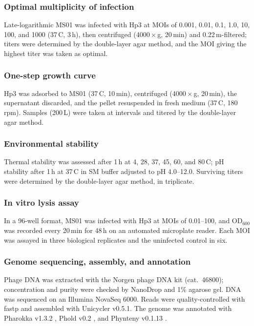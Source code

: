 \subsubsection*{Optimal multiplicity of infection}
Late-logarithmic MS01 was infected with Hp3 at MOIs of 0.001, 0.01, 0.1, 1.0, 10,
100, and 1000 (37\,\textdegree C, 3\,h), then centrifuged (4000\,$\times$\,g,
20\,min) and 0.22\,\textmu m-filtered; titers were determined by the double-layer
agar method, and the MOI giving the highest titer was taken as optimal.

\subsubsection*{One-step growth curve}
Hp3 was adsorbed to MS01 (37\,\textdegree C, 10\,min), centrifuged
(4000\,$\times$\,g, 20\,min), the supernatant discarded, and the pellet resuspended
in fresh medium (37\,\textdegree C, 180\,rpm). Samples (200\,\textmu L) were taken
at intervals and titered by the double-layer agar method.

\subsubsection*{Environmental stability}
Thermal stability was assessed after 1\,h at 4, 28, 37, 45, 60, and
80\,\textdegree C; pH stability after 1\,h at 37\,\textdegree C in SM buffer
adjusted to pH 4.0--12.0. Surviving titers were determined by the double-layer agar
method, in triplicate.

\subsubsection*{In vitro lysis assay}
In a 96-well format, MS01 was infected with Hp3 at MOIs of 0.01--100, and
$\mathrm{OD}_{600}$ was recorded every 20\,min for 48\,h on an automated microplate
reader. Each MOI was assayed in three biological replicates and the uninfected
control in six.

\subsubsection*{Genome sequencing, assembly, and annotation}
Phage DNA was extracted with the Norgen phage DNA kit (cat.\ 46800); concentration
and purity were checked by NanoDrop and 1\% agarose gel. DNA was sequenced on an
Illumina NovaSeq 6000. Reads were quality-controlled with fastp
\citep{2018-Fastp_Chen} and assembled with Unicycler v0.5.1. The genome was
annotated with Pharokka v1.3.2 \citep{2022-Pharokka_Bouras}, Phold v0.2
\citep{2026-Protein_Bouras}, and Phynteny v0.1.13
\citep{2024-Susiegriggo_SusieGrigson}.

